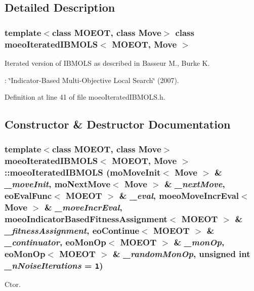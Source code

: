 \subsection{Detailed Description}
\subsubsection*{template$<$class MOEOT, class Move$>$ class moeo\-Iterated\-IBMOLS$<$ MOEOT, Move $>$}

Iterated version of IBMOLS as described in Basseur M., Burke K. 

: \char`\"{}Indicator-Based Multi-Objective Local Search\char`\"{} (2007). 



Definition at line 41 of file moeo\-Iterated\-IBMOLS.h.

\subsection{Constructor \& Destructor Documentation}
\subsubsection{\setlength{\rightskip}{0pt plus 5cm}template$<$class MOEOT, class Move$>$ \bf{moeo\-Iterated\-IBMOLS}$<$ MOEOT, Move $>$::\bf{moeo\-Iterated\-IBMOLS} (mo\-Move\-Init$<$ Move $>$ \& {\em \_\-move\-Init}, mo\-Next\-Move$<$ Move $>$ \& {\em \_\-next\-Move}, \bf{eo\-Eval\-Func}$<$ MOEOT $>$ \& {\em \_\-eval}, \bf{moeo\-Move\-Incr\-Eval}$<$ Move $>$ \& {\em \_\-move\-Incr\-Eval}, \bf{moeo\-Indicator\-Based\-Fitness\-Assignment}$<$ MOEOT $>$ \& {\em \_\-fitness\-Assignment}, \bf{eo\-Continue}$<$ MOEOT $>$ \& {\em \_\-continuator}, \bf{eo\-Mon\-Op}$<$ MOEOT $>$ \& {\em \_\-mon\-Op}, \bf{eo\-Mon\-Op}$<$ MOEOT $>$ \& {\em \_\-random\-Mon\-Op}, unsigned int {\em \_\-n\-Noise\-Iterations} = {\tt 1})\hspace{0.3cm}{\tt  [inline]}}\label{classmoeoIteratedIBMOLS_2140e1b0e3c23238ecd16863c068122f}


Ctor. 

